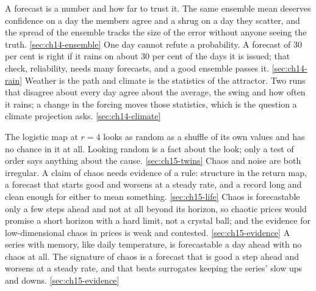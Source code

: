 %
  {A forecast is a number and how far to trust it. The same ensemble mean deserves confidence on a day the members agree and a shrug on a day they scatter, and the spread of the ensemble tracks the size of the error without anyone seeing the truth.}%
  {\ref{sec:ch14-ensemble}}
%
  {One day cannot refute a probability. A forecast of 30 per cent is right if it rains on about 30 per cent of the days it is issued; that check, reliability, needs many forecasts, and a good ensemble passes it.}%
  {\ref{sec:ch14-rain}}
%
  {Weather is the path and climate is the statistics of the attractor. Two runs that disagree about every day agree about the average, the swing and how often it rains; a change in the forcing moves those statistics, which is the question a climate projection asks.}%
  {\ref{sec:ch14-climate}}

%
  {The logistic map at $r = 4$ looks as random as a shuffle of its own values and has no chance in it at all. Looking random is a fact about the look; only a test of order says anything about the cause.}%
  {\ref{sec:ch15-twins}}
%
  {Chaos and noise are both irregular. A claim of chaos needs evidence of a rule: structure in the return map, a forecast that starts good and worsens at a steady rate, and a record long and clean enough for either to mean something.}%
  {\ref{sec:ch15-life}}
%
  {Chaos is forecastable only a few steps ahead and not at all beyond its horizon, so chaotic prices would promise a short horizon with a hard limit, not a crystal ball; and the evidence for low-dimensional chaos in prices is weak and contested.}%
  {\ref{sec:ch15-evidence}}
%
  {A series with memory, like daily temperature, is forecastable a day ahead with no chaos at all. The signature of chaos is a forecast that is good a step ahead and worsens at a steady rate, and that beats surrogates keeping the series' slow ups and downs.}%
  {\ref{sec:ch15-evidence}}

